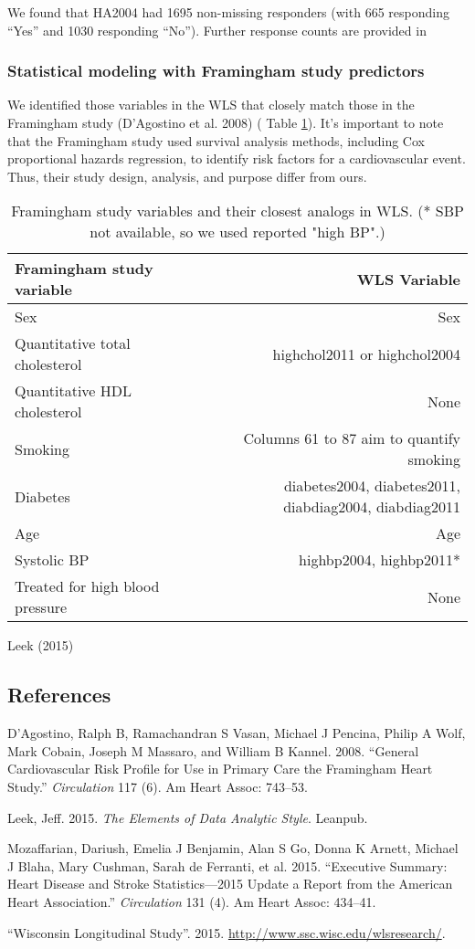 \documentclass[11pt,]{article}
\begin{document}
We found that HA2004 had 1695 non-missing responders (with 665
responding ``Yes'' and 1030 responding ``No''). Further response counts
are provided in

\subsubsection{Statistical modeling with Framingham study
predictors}\label{statistical-modeling-with-framingham-study-predictors}

We identified those variables in the WLS that closely match those in the
Framingham study (D'Agostino et al. 2008) ( Table \ref{tab:fram2wls}).
It's important to note that the Framingham study used survival analysis
methods, including Cox proportional hazards regression, to identify risk
factors for a cardiovascular event. Thus, their study design, analysis,
and purpose differ from ours.

\begin{table}
\begin{tabular}{l r}\label{tab:fram2wls}
Framingham study variable & WLS Variable\\
\hline
Sex & Sex\\
Quantitative total cholesterol & highchol2011 or highchol2004\\
Quantitative HDL cholesterol & None\\
Smoking & Columns 61 to 87 aim to quantify smoking \\
Diabetes & diabetes2004, diabetes2011, diabdiag2004, diabdiag2011\\
Age & Age\\
Systolic BP & highbp2004, highbp2011* \\
Treated for high blood pressure & None\\
\hline
\end{tabular}
\caption{Framingham study variables and their closest analogs in WLS. (* SBP not available, so we used reported "high BP".)}
\end{table}

Leek (2015)

\subsection*{References}\label{references}

D'Agostino, Ralph B, Ramachandran S Vasan, Michael J Pencina, Philip A
Wolf, Mark Cobain, Joseph M Massaro, and William B Kannel. 2008.
``General Cardiovascular Risk Profile for Use in Primary Care the
Framingham Heart Study.'' \emph{Circulation} 117 (6). Am Heart Assoc:
743--53.

Leek, Jeff. 2015. \emph{The Elements of Data Analytic Style}. Leanpub.

Mozaffarian, Dariush, Emelia J Benjamin, Alan S Go, Donna K Arnett,
Michael J Blaha, Mary Cushman, Sarah de Ferranti, et al. 2015.
``Executive Summary: Heart Disease and Stroke Statistics---2015 Update a
Report from the American Heart Association.'' \emph{Circulation} 131
(4). Am Heart Assoc: 434--41.

``Wisconsin Longitudinal Study''. 2015.
\url{http://www.ssc.wisc.edu/wlsresearch/}.
\end{document}
